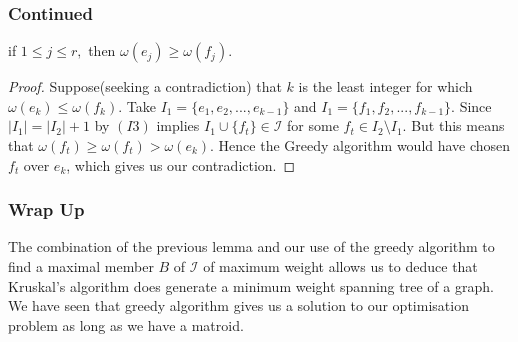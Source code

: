 \documentclass{beamer}
\begin{document}
\begin{frame}
\frametitle{Continued}
\begin{lemma}
if $1 \leq j \leq r,$ then $\omega(e_j) \geq \omega(f_j).$
\end{lemma}
\begin{proof}
Suppose(seeking a contradiction) that $k$ is the least integer for which $\omega(e_k) \leq \omega(f_k).$ Take $I_1 = \{e_1, e_2, ..., e_{k-1}\}$ and $I_1 = \{f_1, f_2, ..., f_{k-1}\}.$ Since $|I_1| = |I_2|+1$ by $(I3)$ implies $I_1 \cup \{f_t\} \in \mathcal{I}$ for some $f_t \in I_2 \setminus I_1.$ But this means that $\omega(f_t) \geq \omega(f_t) > \omega(e_k).$ Hence the Greedy algorithm would have chosen $f_t$ over $e_k$, which gives us our contradiction.
\end{proof}

\end{frame}

\begin{frame}
\frametitle{Wrap Up}

The combination of the previous lemma and our use of the greedy algorithm to find a maximal member $B$ of $\mathcal{I}$ of maximum weight allows us to deduce that Kruskal's algorithm does generate a minimum weight spanning tree of a graph. \\We have seen that greedy algorithm gives us a solution to our optimisation problem as long as we have a matroid.
\end{frame}
\end{document}
